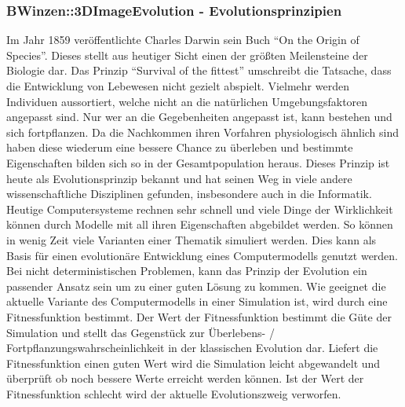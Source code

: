 \documentclass[../mciAusarbeitung.tex]{subfiles}
\begin{document}
	
\subsubsection{BWinzen::3DImageEvolution - Evolutionsprinzipien}
		Im Jahr 1859 veröffentlichte Charles Darwin sein Buch ``On the Origin of Species''. Dieses stellt aus heutiger Sicht einen der größten Meilensteine der Biologie dar. Das Prinzip ``Survival of the fittest'' umschreibt die Tatsache, dass die Entwicklung von Lebewesen nicht gezielt abspielt. Vielmehr werden Individuen aussortiert, welche nicht an die natürlichen Umgebungsfaktoren angepasst sind. Nur wer an die Gegebenheiten angepasst ist, kann bestehen und sich fortpflanzen. Da die Nachkommen ihren Vorfahren physiologisch ähnlich sind haben diese wiederum eine bessere Chance zu überleben und bestimmte Eigenschaften bilden sich so in der Gesamtpopulation heraus. Dieses Prinzip ist heute als Evolutionsprinzip bekannt und hat seinen Weg in viele andere wissenschaftliche Disziplinen gefunden, insbesondere auch in die Informatik. \\
		Heutige Computersysteme rechnen sehr schnell und viele Dinge der Wirklichkeit können durch Modelle mit all ihren Eigenschaften abgebildet werden. So können in wenig Zeit viele Varianten einer Thematik simuliert werden. Dies kann als Basis für einen evolutionäre Entwicklung eines Computermodells genutzt werden.\\
		Bei nicht deterministischen Problemen, kann das Prinzip der Evolution ein passender Ansatz sein um zu einer guten Lösung zu kommen. Wie geeignet die aktuelle Variante des Computermodells in einer Simulation ist, wird durch eine Fitnessfunktion bestimmt. Der Wert der Fitnessfunktion bestimmt die Güte der Simulation und stellt das Gegenstück zur Überlebens- / Fortpflanzungswahrscheinlichkeit in der klassischen Evolution dar.
		 Liefert die Fitnessfunktion einen guten Wert wird die Simulation leicht abgewandelt und überprüft ob noch bessere Werte erreicht werden können. Ist der Wert der Fitnessfunktion schlecht wird der aktuelle Evolutionszweig verworfen.
		
\end{document}
